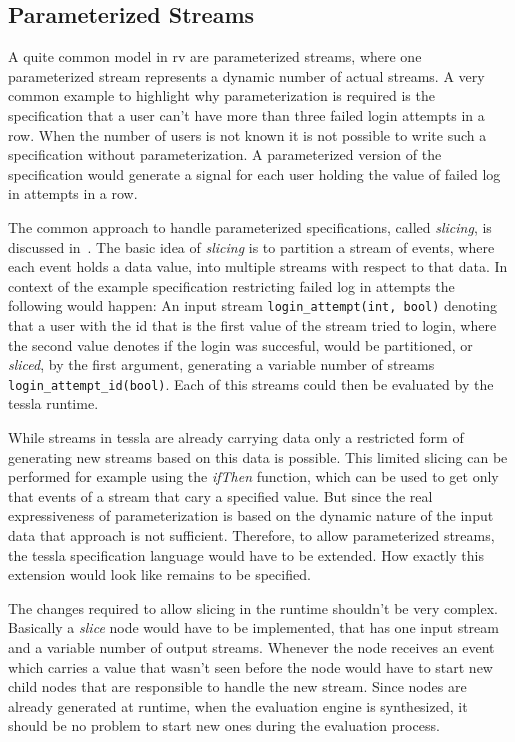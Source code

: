 

\subsection{Parameterized Streams}
\label{sec:conclusion:further_work:parametrization}

A quite common model in \gls{rv} are parameterized streams, where one parameterized stream represents a dynamic number of actual streams.
A very common example to highlight why parameterization is required is the specification that a user can't have more than three failed login attempts in a row.
When the number of users is not known it is not possible to write such a specification without parameterization.
A parameterized version of the specification would generate a signal for each user holding the value of failed log in attempts in a row.

The common approach to handle parameterized specifications, called \emph{slicing}, is discussed in~\cite{Chen2009a}.
The basic idea of \emph{slicing} is to partition a stream of events, where each event holds a data value, into multiple streams with respect to that data.
In context of the example specification restricting failed log in attempts the following would happen:
An input stream \lstinline{login_attempt(int, bool)} denoting that a user with the id that is the first value of the stream tried to login, where the second value denotes if the login was succesful, would be partitioned, or \emph{sliced}, by the first argument, generating a variable number of streams \lstinline{login_attempt_id(bool)}.
Each of this streams could then be evaluated by the \gls{tessla} runtime.

While streams in \gls{tessla} are already carrying data only a restricted form of generating new streams based on this data is possible.
This limited slicing can be performed for example using the \emph{ifThen} function, which can be used to get only that events of a stream that cary a specified value.
But since the real expressiveness of parameterization is based on the dynamic nature of the input data that approach is not sufficient.
Therefore, to allow parameterized streams, the \gls{tessla} specification language would have to be extended.
How exactly this extension would look like remains to be specified.

The changes required to allow slicing in the runtime shouldn't be very complex.
Basically a \emph{slice} node would have to be implemented, that has one input stream and a variable number of output streams.
Whenever the node receives an event which carries a value that wasn't seen before the node would have to start new child nodes that are responsible to handle the new stream.
Since nodes are already generated at runtime, when the evaluation engine is synthesized, it should be no problem to start new ones during the evaluation process.



